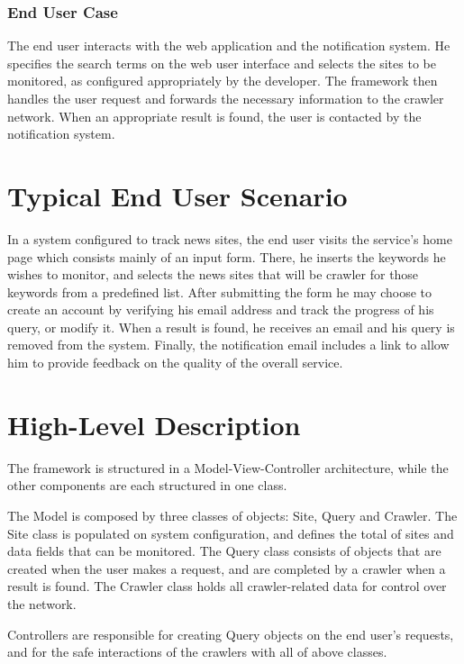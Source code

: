 \documentclass[a4paper,10pt]{article} \usepackage{anysize}
\begin{document}
    \subsubsection{End User Case}
        The end user interacts with the web application and the
        notification system. He specifies the search terms on the web user
        interface and selects the sites to be monitored, as configured
        appropriately by the developer. The framework then handles the
        user request and forwards the necessary information to the crawler
        network. When an appropriate result is found, the user is
        contacted by the notification system. 

\section{Typical End User Scenario}
    In a system configured to track news sites, the end user visits the
    service's home page which consists mainly of an input form. There, he
    inserts the keywords he wishes to monitor, and selects the news sites that
    will be crawler for those keywords from a predefined list. After submitting
    the form he may choose to create an account by verifying his email address
    and track the progress of his query, or modify it. When a result is found,
    he receives an email and his query is removed from the system. Finally, the
    notification email includes a link to allow him to provide feedback on the
    quality of the overall service.

\section{High-Level Description}
    The framework is structured in a Model-View-Controller architecture, while
    the other components are each structured in one class.

    The Model is composed by three classes of objects: Site, Query and Crawler.
    The Site class is populated on system configuration, and defines the total
    of sites and data fields that can be monitored. The Query class consists of
    objects that are created when the user makes a request, and are completed
    by a crawler when a result is found. The Crawler class holds all
    crawler-related data for control over the network. 
    
    Controllers are responsible for creating Query objects on the end user's
    requests, and for the safe interactions of the crawlers with all of above
    classes. 
    
\end{document}
